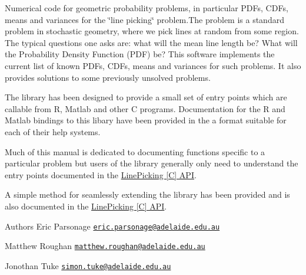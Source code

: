 Numerical code for geometric probability problems, in particular P\-D\-Fs, C\-D\-Fs, means and variances for the \char`\"{}line picking\char`\"{} problem.\-The problem is a standard problem in stochastic geometry, where we pick lines at random from some region. The typical questions one asks are\-: what will the mean line length be? What will the Probability Density Function (P\-D\-F) be? This software implements the current list of known P\-D\-Fs, C\-D\-Fs, means and variances for such problems. It also provides solutions to some previously unsolved problems.

The library has been designed to provide a small set of entry points which are callable from R, Matlab and other C programs. Documentation for the R and Matlab bindings to this libary have been provided in the a format suitable for each of their help systems.

Much of this manual is dedicated to documenting functions specific to a particular problem but users of the library generally only need to understand the entry points documented in the \hyperlink{group__api}{Line\-Picking \mbox{[}C\mbox{]} A\-P\-I}.

A simple method for seamlessly extending the library has been provided and is also documented in the \hyperlink{group__api}{Line\-Picking \mbox{[}C\mbox{]} A\-P\-I}.

\begin{DoxyAuthor}{Authors}
Eric Parsonage \href{mailto:eric.parsonage@adelaide.edu.au}{\tt eric.\-parsonage@adelaide.\-edu.\-au} 

Matthew Roughan \href{mailto:matthew.roughan@adelaide.edu.au}{\tt matthew.\-roughan@adelaide.\-edu.\-au} 

Jonothan Tuke \href{mailto:simon.tuke@adelaide.edu.au}{\tt simon.\-tuke@adelaide.\-edu.\-au} 
\end{DoxyAuthor}
